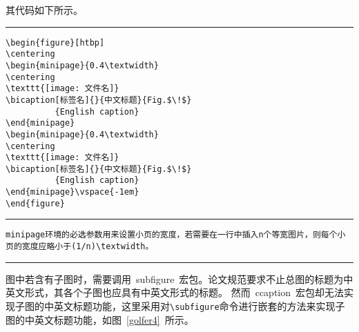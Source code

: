 其代码如下所示。
\vspace{1em}\noindent\hrule
\begin{verbatim}
\begin{figure}[htbp]
\centering
\begin{minipage}{0.4\textwidth}
\centering
\texttt{[image: 文件名]}
\bicaption[标签名]{}{中文标题}{Fig.$\!$}
          {English caption}
\end{minipage}
\begin{minipage}{0.4\textwidth}
\centering
\texttt{[image: 文件名]}
\bicaption[标签名]{}{中文标题}{Fig.$\!$}
          {English caption}
\end{minipage}\vspace{-1em}
\end{figure}
\end{verbatim}
\noindent\hrule
\begin{verbatim}
minipage环境的必选参数用来设置小页的宽度，若需要在一行中插入n个等宽图片，则每个小页的宽度应略小于(1/n)\textwidth。
\end{verbatim}
\noindent\hrule


图中若含有子图时，需要调用~subfigure~宏包。论文规范要求不止总图的标题为中英文形式，其各个子图也应具有中英文形式的标题。
然而~ccaption~宏包却无法实现子图的中英文标题功能，这里采用对\verb|\subfigure|命令进行嵌套的方法来实现子图的中英文标题功能，如图~\ref{golfer4}~所示。

\begin{figure}[htbp]
\centering
\subfigure{\label{golfer41}}\addtocounter{subfigure}{-2}
\subfigure{\label{golfer42}}\addtocounter{subfigure}{-2}
\vspace{-1em}
\end{figure}

